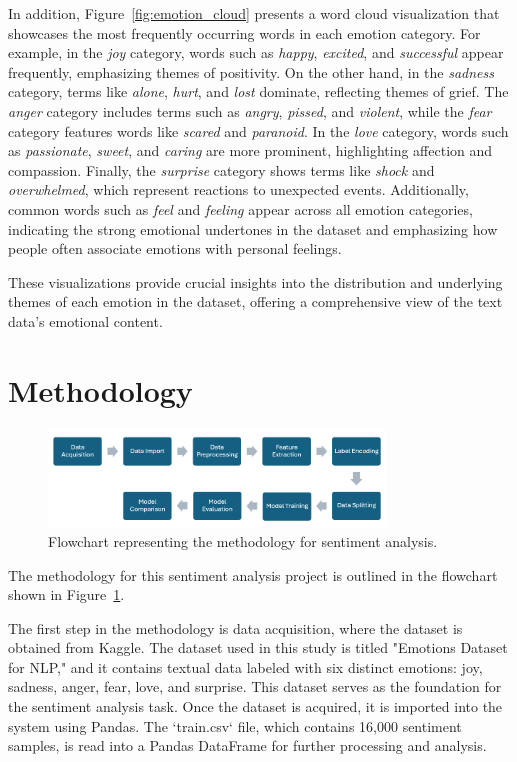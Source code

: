 In addition, Figure~\ref{fig:emotion_cloud} presents a word cloud visualization that showcases the most frequently occurring words in each emotion category. For example, in the \textit{joy} category, words such as \textit{happy}, \textit{excited}, and \textit{successful} appear frequently, emphasizing themes of positivity. On the other hand, in the \textit{sadness} category, terms like \textit{alone}, \textit{hurt}, and \textit{lost} dominate, reflecting themes of grief. The \textit{anger} category includes terms such as \textit{angry}, \textit{pissed}, and \textit{violent}, while the \textit{fear} category features words like \textit{scared} and \textit{paranoid}. In the \textit{love} category, words such as \textit{passionate}, \textit{sweet}, and \textit{caring} are more prominent, highlighting affection and compassion. Finally, the \textit{surprise} category shows terms like \textit{shock} and \textit{overwhelmed}, which represent reactions to unexpected events. Additionally, common words such as \textit{feel} and \textit{feeling} appear across all emotion categories, indicating the strong emotional undertones in the dataset and emphasizing how people often associate emotions with personal feelings.

These visualizations provide crucial insights into the distribution and underlying themes of each emotion in the dataset, offering a comprehensive view of the text data's emotional content.

\section{Methodology}

\begin{figure}[H]
    \centering
    \includegraphics[width=0.8\textwidth]{images/methodology_flow.png}
    \caption{Flowchart representing the methodology for sentiment analysis.}
    \label{fig:methodology_flow}
\end{figure}

The methodology for this sentiment analysis project is outlined in the flowchart shown in Figure~\ref{fig:methodology_flow}.

The first step in the methodology is data acquisition, where the dataset is obtained from Kaggle. The dataset used in this study is titled "Emotions Dataset for NLP," and it contains textual data labeled with six distinct emotions: joy, sadness, anger, fear, love, and surprise. This dataset serves as the foundation for the sentiment analysis task. Once the dataset is acquired, it is imported into the system using Pandas. The `train.csv` file, which contains 16,000 sentiment samples, is read into a Pandas DataFrame for further processing and analysis.

